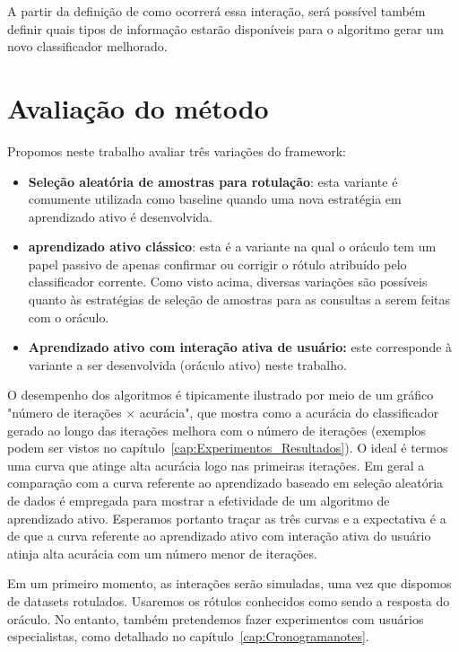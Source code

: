 A partir da definição de como ocorrerá essa interação, será possível também definir quais tipos de informação estarão disponíveis para o algoritmo gerar um novo classificador melhorado.



\section{Avaliação do método}
\label{sec:avaliação do método}

Propomos neste trabalho avaliar três variações do framework:
\begin{itemize}
    \item {\bf Seleção aleatória de amostras para rotulação}: esta variante é comumente utilizada como baseline quando uma nova estratégia em aprendizado ativo é desenvolvida.
    
    \item {\bf aprendizado ativo clássico}: esta é a variante na qual o oráculo tem um papel passivo de apenas confirmar ou corrigir o rótulo atribuído pelo classificador corrente. Como visto acima, diversas variações são possíveis quanto às estratégias de seleção de amostras para as consultas a serem feitas com o oráculo.
    
\item {\bf Aprendizado ativo com interação ativa de usuário:} este corresponde à variante a ser desenvolvida (oráculo ativo) neste trabalho.
\end{itemize}

O desempenho dos algoritmos é tipicamente ilustrado por meio de um gráfico "número de iterações $\times$  acurácia", que mostra como a acurácia do classificador gerado ao longo das iterações melhora com o número de iterações (exemplos podem ser vistos no capítulo~\ref{cap:Experimentos_Resultados}). O ideal é termos uma curva que atinge alta acurácia logo nas primeiras iterações. Em geral a comparação com a curva referente ao aprendizado baseado em seleção aleatória de dados é empregada para mostrar a efetividade de um algoritmo de aprendizado ativo. Esperamos portanto traçar as três curvas e a expectativa é a de que a curva referente ao aprendizado ativo com interação ativa do usuário atinja alta acurácia com um número menor de iterações.

Em um primeiro momento, as interações serão simuladas, uma vez que dispomos de datasets rotulados. Usaremos os rótulos conhecidos como sendo a resposta do oráculo. No entanto, também pretendemos fazer experimentos com usuários especialistas, como detalhado no capítulo~\ref{cap:Cronogramanotes}.

